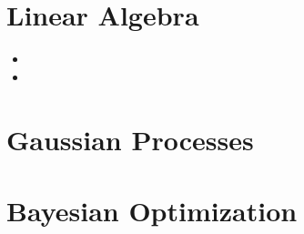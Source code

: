 \documentclass[12pt]{article}
\begin{document}
\begin{multicols*}{2}
 
\section{Linear Algebra}
\begin{itemize}[label = $\triangleright$, itemsep = -3pt, topsep = -10pt, leftmargin = *]
  \item 
  \item 
\end{itemize}

\section{Gaussian Processes}

\section{Bayesian Optimization}

\end{multicols*}
\end{document}
